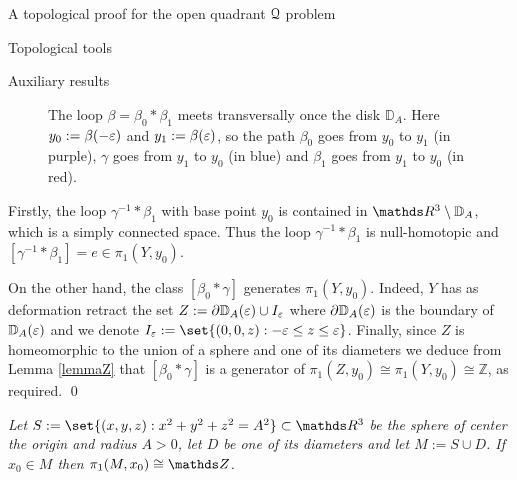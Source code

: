 \documentclass[11pt, a4paper, english, twoside, notitlepage, openright]{report}
\begin{document}
\begin{chapter}{A topological proof for the open quadrant $\mathcal{Q}$ problem}
\begin{section}{Topological tools}
\begin{subsection}{Auxiliary results}
\begin{lemma}
\begin{Proof}
\begin{figure}[ht!]
\begin{center}
\caption[The loop $\beta=\beta_0\ast\beta_1$ meets transversally once the disk ${\mathbb D}_A$.]{The loop $\beta=\beta_0\ast\beta_1$ meets transversally once the disk ${\mathbb D}_A$. Here $y_0:=\beta(-\varepsilon)$ and $y_1:=\beta(\varepsilon)$, so the path $\beta_0$ goes from $y_0$ to $y_1$ (in purple), $\gamma$ goes from $y_1$ to $y_0$ (in blue) and $\beta_1$ goes from $y_1$ to $y_0$ (in red).}\label{fig:disc}
\end{center}
\end{figure}
Firstly, the loop $\gamma^{-1}\ast\beta_1$ with base point $y_0$ is contained in $\R^3\setminus{\mathbb D}_A$, which is a simply connected space. Thus the loop $\gamma^{-1}*\beta_1$ is null-homotopic and $[\gamma^{-1}*\beta_1]=e \in \pi_1(Y,y_0)$.

\vspace{1mm}

On the other hand, the class $[\beta_0\ast\gamma]$ generates $\pi_1(Y,y_0)$. Indeed, $Y$ has as deformation retract the set $Z:=\partial{\mathbb D}_A(\varepsilon)\cup I_\varepsilon$ where $\partial{\mathbb D}_A(\varepsilon)$ is the boundary of ${\mathbb D}_A(\varepsilon)$ and we denote $I_\eps:=\set{(0,0,z):-\eps\le z\le\eps}$. Finally, since $Z$ is homeomorphic to the union of a sphere and one of its diameters we deduce from Lemma \ref{lemmaZ} that $[\beta_0\ast\gamma]$ is a generator of $\pi_1(Z,y_0)\cong\pi_1(Y,y_0)\cong{\mathbb Z}$, as required.
\qed 
\end{Proof}
\end{lemma}

\vspace{1mm}

\begin{lemma}\label{lemmaZ} \em Let $S:=\set{(x,y,z):x^2+y^2+z^2=A^2}\subset\R^3$ be the sphere of center the origin and radius $A> 0$, let $D$ be one of its diameters and let $M := S\cup D$. If $x_0\in M$ then $\pi_1(M,x_0)\cong\Z$. \em 


\end{lemma}
\end{subsection}
\end{section}
\end{chapter}
\end{document}
